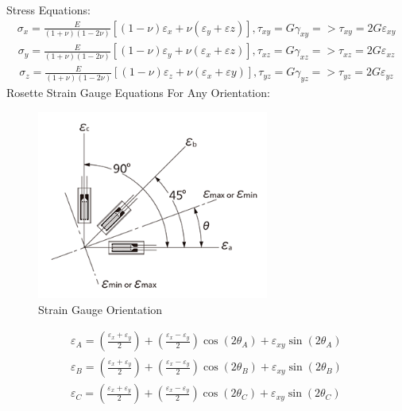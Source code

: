 \begin{center}
Stress Equations:
\begin{gather}
    \sigma_{x} = \frac{E}{(1+\nu)(1-2\nu)}[(1-\nu)\varepsilon_{x} + \nu(\varepsilon_{y} + \varepsilon{z})], \tau_{xy} = G\gamma_{xy} => \tau_{xy} = 2G\varepsilon_{xy}
\end{gather}
\begin{gather}
    \sigma_{y} = \frac{E}{(1+\nu)(1-2\nu)}[(1-\nu)\varepsilon_{y} + \nu(\varepsilon_{x} + \varepsilon{z})], \tau_{xz} = G\gamma_{xz} => \tau_{xz} = 2G\varepsilon_{xz}
\end{gather}
\begin{gather}
    \sigma_{z} = \frac{E}{(1+\nu)(1-2\nu)}[(1-\nu)\varepsilon_{z} + \nu(\varepsilon_{x} + \varepsilon{y})], \tau_{yz} = G\gamma_{yz} => \tau_{yz} = 2G\varepsilon_{yz}
\end{gather}
Rosette Strain Gauge Equations For Any Orientation:

\begin{figure}[H]
        \centering
        \includegraphics[width=3in]{images/Strain Gauge/Strain Gauge Orientation.png}
        \caption{Strain Gauge Orientation}
        \label{fig:Strain Gauge Orientation}
\end{figure}

\begin{gather}
    \varepsilon_{A} = (\frac{\varepsilon_{x} + \varepsilon_{y}} {2}) +  (\frac{\varepsilon_{x} - \varepsilon_{y}} {2})\cos({2\theta_{A}}) + \varepsilon_{xy}\sin({2\theta_{A}}) \\
    \varepsilon_{B} = (\frac{\varepsilon_{x} + \varepsilon_{y}} {2}) +  (\frac{\varepsilon_{x} - \varepsilon_{y}} {2})\cos({2\theta_{B}}) + \varepsilon_{xy}\sin({2\theta_{B}})\\
\varepsilon_{C} = (\frac{\varepsilon_{x} + \varepsilon_{y}} {2}) +  (\frac{\varepsilon_{x} - \varepsilon_{y}} {2})\cos({2\theta_{C}}) + \varepsilon_{xy}\sin({2\theta_{C}})
\end{gather}

\end{center} 


